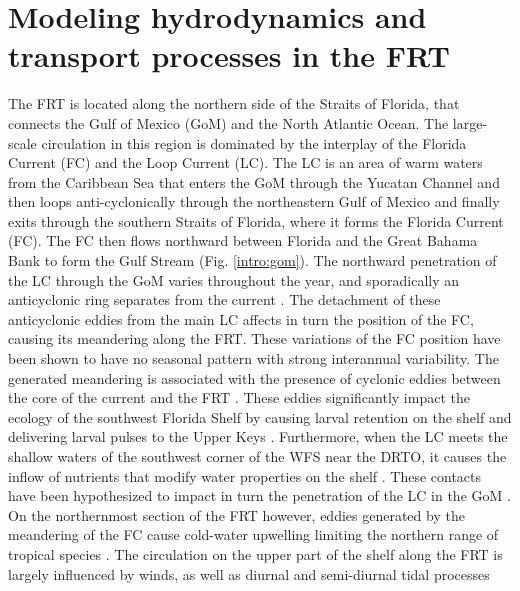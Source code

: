 \section{Modeling hydrodynamics and transport processes in the FRT}
The FRT is located along the northern side of the Straits of Florida, that connects the Gulf of Mexico (GoM) and the North Atlantic Ocean. The large-scale circulation in this region is dominated by the interplay of the Florida Current (FC) and the Loop Current (LC). The LC is an area of warm waters from the Caribbean Sea that enters the GoM through the Yucatan Channel and then loops anti-cyclonically through the northeastern Gulf of Mexico and finally exits through the southern Straits of Florida, where it forms the Florida Current (FC). The FC then flows northward between Florida and the Great Bahama Bank to form the Gulf Stream (Fig. \ref{intro:gom}). The northward penetration of the LC through the GoM varies throughout the year, and sporadically an anticyclonic ring separates from the current \citep{leipper1970sequence, maul1977annual, vukovich1988loop}. The detachment of these anticyclonic eddies from the main LC affects in turn the position of the FC, causing its meandering along the FRT. These variations of the FC position have been shown to have no seasonal pattern with strong interannual variability. The generated meandering is associated with the presence of cyclonic eddies between the core of the current and the FRT \citep{kourafalou2012florida}. These eddies significantly impact the ecology of the southwest Florida Shelf by causing larval retention on the shelf and delivering larval pulses to the Upper Keys \citep{lee1994evolution, sponaugle2005florida, kourafalou2012florida}. Furthermore, when the LC meets the shallow waters of the southwest corner of the WFS near the DRTO, it causes the inflow of nutrients that modify water properties on the shelf \citep{weisberg2003local, liu2016offshore}. These contacts have been hypothesized to impact in turn the penetration of the LC in the GoM \citep{weisberg2017loop}. On the northernmost section of the FRT however, eddies generated by the meandering of the FC cause cold-water upwelling limiting the northern range of tropical species \citep{walker2013determining}. The circulation on the upper part of the shelf along the FRT is largely influenced by winds, as well as diurnal and semi-diurnal tidal processes \citep{lee2001transport, lee2002volume,d2007patterns}

